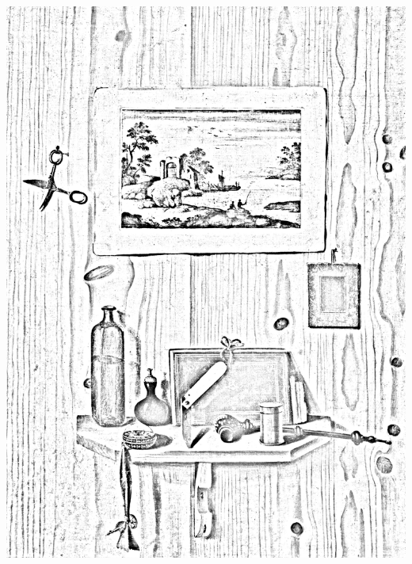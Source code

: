 \documentclass[hidelinks,12pt,a4paper]{article}
\begin{document}
\begin{adjustwidth}{-30mm}{-30mm}
			\thispagestyle{empty}
			\begin{minipage}{0.91\linewidth}
				\centering
				\includegraphics[scale=0.2]{Gianlisi_Antonio_Junior-Trompe_l_oeil_con_paesaggio_forbici_e_mensola_con_oggetti.jpg}
			\end{minipage}
			
			\vspace*{\fill}
			\newpage
			

\end{adjustwidth}
\end{document}
